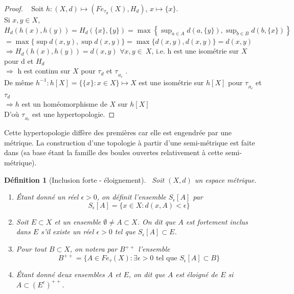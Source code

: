 \documentclass[11pt]{report}
\newenvironment{boxdefinition}
{\begin{tcolorbox}
		[enhanced jigsaw,breakable,pad at break*=1mm,
		colback=black!5!white,boxrule=0pt,frame hidden,
		borderline west={1.5mm}{-2mm}{blue}]}
	{\end{tcolorbox}}
\theoremstyle{styletheorem}
\theoremstyle{styledef}
\newtheorem{definitions}[theoreme]{Définition}
\theoremstyle{remark}
\newenvironment{definition}{\vspace*{0.3cm}\begin{boxdefinition}\begin{definitions}}{\end{definitions}\end{boxdefinition}\vspace*{0.3cm}}
\newcommand{\Fe}{\ensuremath{Fe_{\tau}(X)}}
\begin{document}
\begin{proof} \ 
	\newline
	Soit $h : (X, d) \longmapsto (Fe_{\tau_{d}}(X), H_{d})$, $x \mapsto \lbrace x \rbrace$.\\
	Si $x,y \in X$,  $H_d (h(x), h(y)) = H_d ( \lbrace x \rbrace, \lbrace y \rbrace) = \max \left\lbrace \sup_{a \in A} d(a,\lbrace y \rbrace), \sup_{b \in B} d(b,  \lbrace x \rbrace) \right\rbrace $ \\ $ = \max \lbrace \sup d(x,y),\sup d(x,y) \rbrace = \max \lbrace d(x,y), d(x,y) \rbrace = d(x,y) $\\
	$\Rightarrow H_{d} (h(x), h(y)) = d(x,y)$ $\forall x,y \in ~X$, i.e. h est une isométrie sur $X$ pour d et $H_d $\\
	$\Rightarrow$ h est continu sur  $ X $ pour $ \tau_d$ et $ \tau_{_{H_d}}$ \cite{b9}.\\
	De même $ h^{-1} : h[X] = \lbrace \lbrace x \rbrace : x \in X \rbrace \longmapsto X  $ est une isométrie sur $h[X]$ pour $\tau_{_ {H_d}}$ et $\tau_d$\\
	$\Rightarrow h$ est un homéomorphisme de $ X $ sur $h[X]$\\
	D'où $\tau_{_ {H_{d}}}$ est une hypertopologie.  
	
\end{proof}
Cette hypertopologie diffère des premières car elle est engendrée par une métrique. La construction d'une topologie à partir d'une semi-métrique est faite dans \cite{b9} (sa base étant la famille des boules ouvertes relativement à cette semi-métrique).\\
%
%
%																	

\begin{definition}[Inclusion forte - éloignement]\
	Soit $(X,d)$ un espace métrique. 
	\begin{enumerate}[label=$\bullet$]
		\item Étant donné un réel $\epsilon >0$, on définit l'ensemble $S_\epsilon [A]$ par $$S_\epsilon [A] = \lbrace x \in X \colon d(x,A) < \epsilon \rbrace$$
		\item 	Soit $E \subset X$ et un ensemble $\emptyset \neq A \subset X$. On dit que $A$ est fortement inclus dans $E$ s'il existe un réel $\epsilon >0$ tel que $S_\epsilon [A] \subset E$.
		\item Pour tout $B \subset X$, on notera par $B^{++}$ l'ensemble 
		$$B^{++} = \lbrace A \in \Fe \colon \exists \epsilon > 0 \text{ tel que } S_\epsilon [A] \subset B \rbrace$$
		\item 	Étant donné deux ensembles $A$ et $E$, on dit que $A$ est éloigné de $E$  si $A \subset  (E^c)^{++}$.
	\end{enumerate}
\end{definition}
\end{document}
